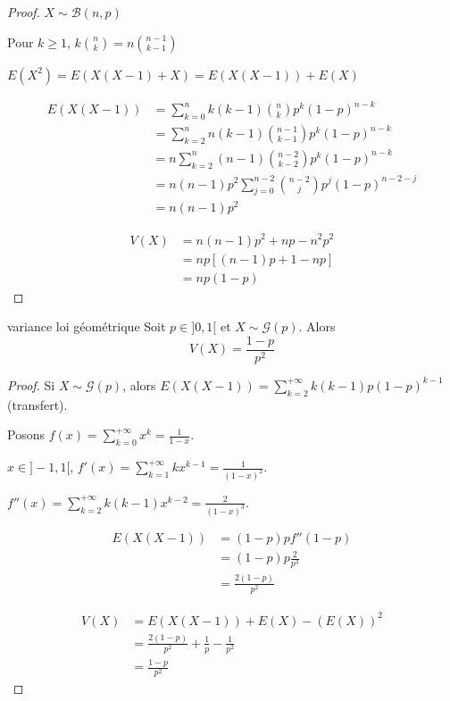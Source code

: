 \begin{proof}
    $X \sim \mathcal B(n, p)$

    Pour $k \geqslant 1$, $\displaystyle k \binom n k = n \binom{n - 1}{k - 1}$

    $E(X^2) = E(X(X - 1) + X) = E(X(X - 1)) + E(X)$

    \begin{align}
        E(X(X - 1)) & = \sum_{k = 0}^n k (k - 1) \binom n k p^k (1 - p)^{n - k} \\
        & = \sum_{k = 2}^n n (k - 1) \binom {n - 1}{k - 1} p^k (1 - p)^{n - k} \\
        & = n \sum_{k = 2 }^{n } (n - 1) \binom{n - 2}{k - 2} p^k (1 - p)^{n - k} \\
        & = n (n - 1) p^2 \sum_{j = 0}^{n - 2} \binom{n - 2}{j} p^j (1 - p)^{n - 2 - j} \\
        & = n (n - 1) p^2
    \end{align}

    \begin{align}
        V(X) & = n(n - 1) p^2 + np - n^2 p^2 \\
        & = n p [(n - 1) p + 1 - n p] \\
        & = n p (1 - p)
    \end{align}
\end{proof}

\begin{proposition}{variance loi géométrique}{}
    Soit $p \in ]0, 1[$ et $X \sim \mathcal G(p)$. Alors 
    $$ V(X) = \frac{1 - p}{p^2} $$
\end{proposition}

\begin{proof}
    Si $X \sim \mathcal G(p)$, alors
    $E(X(X - 1)) = \displaystyle \sum_{k = 2}^{+ \infty} k (k - 1) p (1 - p)^{k - 1}$ (transfert).

    Posons $\displaystyle f(x) = \sum_{k = 0}^{+ \infty} x^k = \frac 1 {1 - x}$.

    $x \in ]-1, 1[$, $f'(x) = \displaystyle \sum_{k = 1}^{+ \infty} k x^{k - 1} = \frac 1 {(1 - x)^2}$.

    $f''(x) = \displaystyle \sum_{k = 2}^{+ \infty} k (k - 1) x^{k - 2} = \frac 2 {(1 - x)^3}$.

    \begin{align}
        E(X(X - 1)) & = (1 - p) p f''(1 - p) \\
        & = (1 - p) p \frac 2 {p^3} \\
        & = \frac{2 (1 - p)}{p^2}
    \end{align}

    \begin{align}
        V(X) & = E(X(X - 1)) + E(X) - (E(X))^2 \\
        & = \frac{2 (1 - p)}{p^2} + \frac 1 p - \frac 1 {p^2} \\
        & = \frac{1 - p}{p^2}
    \end{align}
\end{proof}

